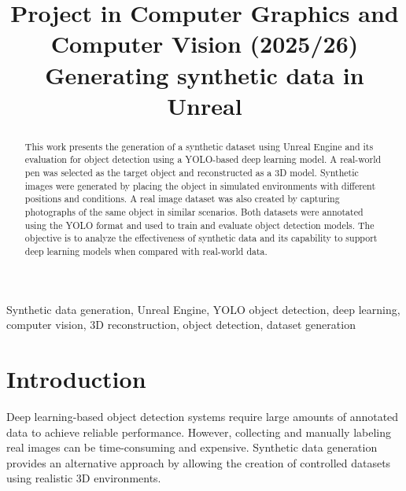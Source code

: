 \documentclass[conference,a4paper]{IEEEtran}
\begin{document}
\title{Project in Computer Graphics and Computer Vision (2025/26)\\
       \Large Generating synthetic data in Unreal}

\author{

    \and
    \and
}

\maketitle

\begin{abstract}

This work presents the generation of a synthetic dataset using Unreal Engine and its evaluation for object detection using a YOLO-based deep learning model. A real-world pen was selected as the target object and reconstructed as a 3D model. Synthetic images were generated by placing the object in simulated environments with different positions and conditions. A real image dataset was also created by capturing photographs of the same object in similar scenarios. Both datasets were annotated using the YOLO format and used to train and evaluate object detection models. The objective is to analyze the effectiveness of synthetic data and its capability to support deep learning models when compared with real-world data.

\end{abstract}

\begin{IEEEkeywords}

Synthetic data generation, Unreal Engine, YOLO object detection, deep learning, computer vision, 3D reconstruction, object detection, dataset generation

\end{IEEEkeywords}

\section{Introduction}

Deep learning-based object detection systems require large amounts of annotated data to achieve reliable performance. However, collecting and manually labeling real images can be time-consuming and expensive. Synthetic data generation provides an alternative approach by allowing the creation of controlled datasets using realistic 3D environments.
\end{document}
